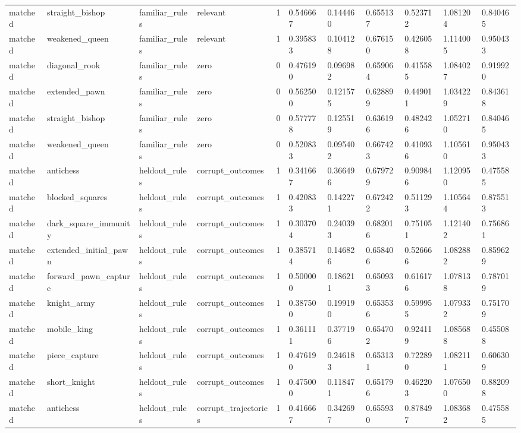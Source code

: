 \begin{tabular}{lllllllllll}
matched & straight\_bishop & familiar\_rules & relevant & 1 & 0.546667 & 0.144460 & 0.655137 & 0.523712 & 1.081204 & 0.840465 \\
matched & weakened\_queen & familiar\_rules & relevant & 1 & 0.395833 & 0.104128 & 0.676150 & 0.426058 & 1.114005 & 0.950433 \\
matched & diagonal\_rook & familiar\_rules & zero & 0 & 0.476190 & 0.096982 & 0.659064 & 0.415585 & 1.084027 & 0.919920 \\
matched & extended\_pawn & familiar\_rules & zero & 0 & 0.562500 & 0.121575 & 0.628899 & 0.449011 & 1.034229 & 0.843618 \\
matched & straight\_bishop & familiar\_rules & zero & 0 & 0.577778 & 0.125519 & 0.636196 & 0.482426 & 1.052710 & 0.840465 \\
matched & weakened\_queen & familiar\_rules & zero & 0 & 0.520833 & 0.095402 & 0.667423 & 0.410936 & 1.105610 & 0.950433 \\
matched & antichess & heldout\_rules & corrupt\_outcomes & 1 & 0.341667 & 0.366496 & 0.679729 & 0.909846 & 1.120950 & 0.475585 \\
matched & blocked\_squares & heldout\_rules & corrupt\_outcomes & 1 & 0.420833 & 0.142271 & 0.672422 & 0.511293 & 1.105644 & 0.875513 \\
matched & dark\_square\_immunity & heldout\_rules & corrupt\_outcomes & 1 & 0.303704 & 0.240393 & 0.682016 & 0.751051 & 1.121402 & 0.756861 \\
matched & extended\_initial\_pawn & heldout\_rules & corrupt\_outcomes & 1 & 0.385714 & 0.146826 & 0.658406 & 0.526666 & 1.082882 & 0.859629 \\
matched & forward\_pawn\_capture & heldout\_rules & corrupt\_outcomes & 1 & 0.500000 & 0.186211 & 0.650933 & 0.616176 & 1.078138 & 0.787019 \\
matched & knight\_army & heldout\_rules & corrupt\_outcomes & 1 & 0.387500 & 0.199190 & 0.653536 & 0.599955 & 1.079332 & 0.751709 \\
matched & mobile\_king & heldout\_rules & corrupt\_outcomes & 1 & 0.361111 & 0.377196 & 0.654702 & 0.924119 & 1.085688 & 0.455088 \\
matched & piece\_capture & heldout\_rules & corrupt\_outcomes & 1 & 0.476190 & 0.246183 & 0.653131 & 0.722890 & 1.082111 & 0.606309 \\
matched & short\_knight & heldout\_rules & corrupt\_outcomes & 1 & 0.475000 & 0.118471 & 0.651796 & 0.462203 & 1.076500 & 0.882098 \\
matched & antichess & heldout\_rules & corrupt\_trajectories & 1 & 0.416667 & 0.342697 & 0.655930 & 0.878497 & 1.083682 & 0.475585 \\

\end{tabular}
